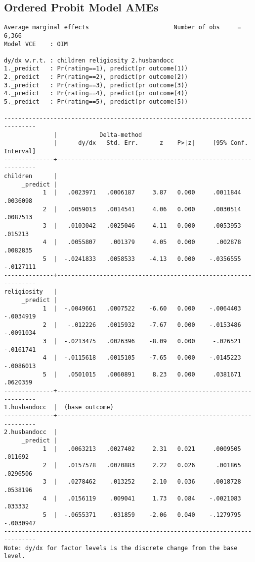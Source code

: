 \documentclass{article}
\begin{document}
\newpage
\hypertarget{oprobitame}{\subsection*{Ordered Probit Model AMEs}}
\begin{verbatim}
Average marginal effects                        Number of obs     =      6,366
Model VCE    : OIM

dy/dx w.r.t. : children religiosity 2.husbandocc
1._predict   : Pr(rating==1), predict(pr outcome(1))
2._predict   : Pr(rating==2), predict(pr outcome(2))
3._predict   : Pr(rating==3), predict(pr outcome(3))
4._predict   : Pr(rating==4), predict(pr outcome(4))
5._predict   : Pr(rating==5), predict(pr outcome(5))

-------------------------------------------------------------------------------
              |            Delta-method
              |      dy/dx   Std. Err.      z    P>|z|     [95% Conf. Interval]
--------------+----------------------------------------------------------------
children      |
     _predict |
           1  |   .0023971   .0006187     3.87   0.000     .0011844    .0036098
           2  |   .0059013   .0014541     4.06   0.000     .0030514    .0087513
           3  |   .0103042   .0025046     4.11   0.000     .0053953     .015213
           4  |   .0055807    .001379     4.05   0.000      .002878    .0082835
           5  |  -.0241833   .0058533    -4.13   0.000    -.0356555   -.0127111
--------------+----------------------------------------------------------------
religiosity   |
     _predict |
           1  |  -.0049661   .0007522    -6.60   0.000    -.0064403   -.0034919
           2  |   -.012226   .0015932    -7.67   0.000    -.0153486   -.0091034
           3  |  -.0213475   .0026396    -8.09   0.000     -.026521   -.0161741
           4  |  -.0115618   .0015105    -7.65   0.000    -.0145223   -.0086013
           5  |   .0501015   .0060891     8.23   0.000     .0381671    .0620359
--------------+----------------------------------------------------------------
1.husbandocc  |  (base outcome)
--------------+----------------------------------------------------------------
2.husbandocc  |
     _predict |
           1  |   .0063213   .0027402     2.31   0.021     .0009505     .011692
           2  |   .0157578   .0070883     2.22   0.026      .001865    .0296506
           3  |   .0278462    .013252     2.10   0.036     .0018728    .0538196
           4  |   .0156119    .009041     1.73   0.084    -.0021083     .033332
           5  |  -.0655371    .031859    -2.06   0.040    -.1279795   -.0030947
-------------------------------------------------------------------------------
Note: dy/dx for factor levels is the discrete change from the base level.
\end{verbatim}
\end{document}
